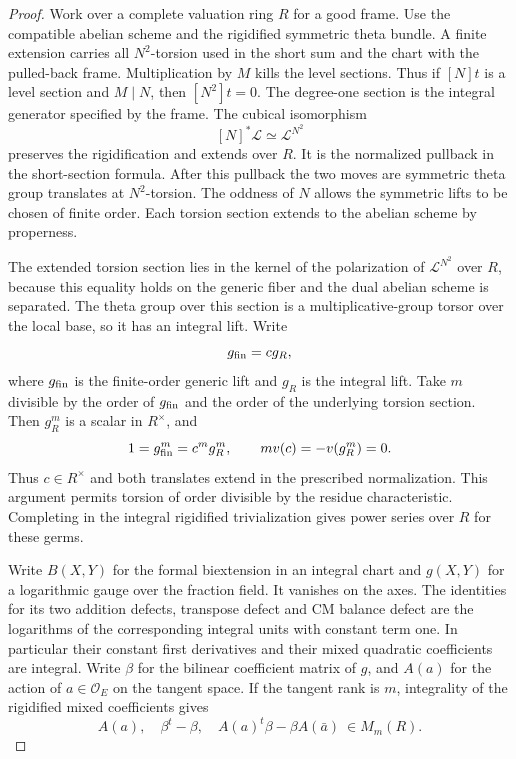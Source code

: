 \begin{proof}
Work over a complete valuation ring \(R\) for a good
frame. Use the compatible abelian scheme and the rigidified
symmetric theta bundle. A finite extension carries all
\(N^2\)-torsion used in the short sum and the chart with the
pulled-back frame. Multiplication by \(M\) kills the
level sections. Thus if \([N]t\) is a level section and
\(M\mid N\), then \([N^2]t=0\).
The degree-one section is the integral generator specified
by the frame. The cubical isomorphism
\[
 [N]^*\mathcal L\simeq\mathcal L^{N^2}
\]
preserves the
rigidification and extends over \(R\). It is the normalized
pullback in the short-section formula. After this pullback
the two moves are symmetric theta group translates at
\(N^2\)-torsion. The oddness of \(N\) allows the symmetric
lifts to be chosen of finite order. Each torsion section
extends to the abelian scheme by properness.

The extended torsion section lies in the kernel of the polarization of \(\mathcal L^{N^2}\)
over \(R\), because this equality holds on the generic
fiber and the dual abelian scheme is separated. The
theta group over this section is a multiplicative-group
torsor over the local base, so it has an integral lift.
Write
\[
 g_{\rm fin}=c g_R,
\]
where \(g_{\rm fin}\) is the
finite-order generic lift and \(g_R\) is the integral lift.
Take \(m\) divisible by the order of \(g_{\rm fin}\) and the
order of the underlying torsion section. Then \(g_R^m\) is
a scalar in \(R^\times\), and
\[
  1=g_{\rm fin}^m=c^m g_R^m,\qquad m v(c)=-v(g_R^m)=0 .
\]
Thus \(c\in R^\times\) and both translates extend in the
prescribed normalization. This argument permits
torsion of order divisible by the residue characteristic.
Completing in the integral rigidified trivialization
gives power series over \(R\) for these germs.

Write \(B(X,Y)\) for the formal biextension in an integral
chart and \(g(X,Y)\) for a logarithmic gauge over the
fraction field. It vanishes on the axes. The identities
for its two addition defects, transpose defect and CM
balance defect are the logarithms of the corresponding
integral units with constant term one. In particular
their constant first derivatives and their mixed
quadratic coefficients are integral. Write \(\beta\)
for the bilinear coefficient matrix of \(g\), and
\(A(a)\) for the action of \(a\in\mathcal O_E\) on the tangent
space. If the tangent rank is \(m\), integrality of the rigidified mixed coefficients gives
\[
 A(a),\quad \beta^t-\beta,\quad A(a)^t\beta-\beta A(\bar a)\ \in M_m(R).
\]


\end{proof}
